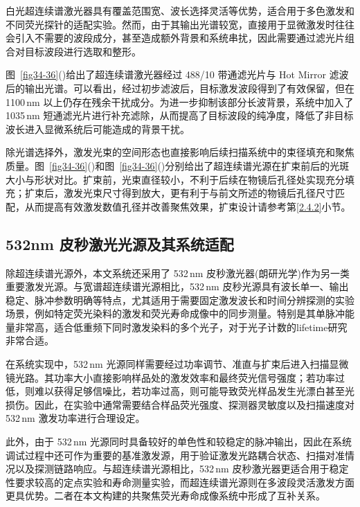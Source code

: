 白光超连续谱激光器具有覆盖范围宽、波长选择灵活等优势，适合用于多色激发和不同荧光探针的适配实验。然而，由于其输出光谱较宽，直接用于显微激发时往往会引入不需要的波段成分，甚至造成额外背景和系统串扰，因此需要通过滤光片组合对目标波段进行选取和整形。


图~\ref{fig34-36}()给出了超连续谱激光器经过 488/10 带通滤光片与 Hot Mirror 滤波后的输出光谱。可以看出，经过初步滤波后，目标激发波段得到了有效保留，但在 1100\,nm 以上仍存在残余干扰成分。为进一步抑制该部分长波背景，系统中加入了 1035\,nm 短通滤光片进行补充滤除，从而提高了目标波段的纯净度，降低了非目标波长进入显微系统后可能造成的背景干扰。

除光谱选择外，激发光束的空间形态也直接影响后续扫描系统中的束径填充和聚焦质量。图~\ref{fig34-36}()和图~\ref{fig34-36}()分别给出了超连续谱光源在扩束前后的光斑大小与形状对比。扩束前，光束直径较小，不利于后续在物镜后孔径处实现充分填充；扩束后，激发光束尺寸得到放大，更有利于与前文所述的物镜后孔径尺寸匹配，从而提高有效激发数值孔径并改善聚焦效果，扩束设计请参考第\ref{2.4.2}小节。




\subsection{532nm 皮秒激光光源及其系统适配}\label{3.2.2}

除超连续谱光源外，本文系统还采用了 532\,nm 皮秒激光器(朗研光学)作为另一类重要激发光源。与宽谱超连续谱光源相比，532\,nm 皮秒光源具有波长单一、输出稳定、脉冲参数明确等特点，尤其适用于需要固定激发波长和时间分辨探测的实验场景，例如特定荧光染料的激发和荧光寿命成像中的同步测量。特别是其单脉冲能量非常高，适合低重频下同时激发染料的多个光子，对于光子计数的lifetime研究非常合适。

在系统实现中，532\,nm 光源同样需要经过功率调节、准直与扩束后进入扫描显微镜光路。其功率大小直接影响样品处的激发效率和最终荧光信号强度；若功率过低，则难以获得足够信噪比，若功率过高，则可能导致荧光样品发生光漂白甚至光损伤。因此，在实验中通常需要结合样品荧光强度、探测器灵敏度以及扫描速度对 532\,nm 激发功率进行合理设定。

此外，由于 532\,nm 光源同时具备较好的单色性和较稳定的脉冲输出，因此在系统调试过程中还可作为重要的基准激发源，用于验证激发光路耦合状态、扫描对准情况以及探测链路响应。与超连续谱光源相比，532\,nm 皮秒激光器更适合用于稳定性要求较高的定点实验和寿命测量实验，而超连续谱光源则在多波段灵活激发方面更具优势。二者在本文构建的共聚焦荧光寿命成像系统中形成了互补关系。



